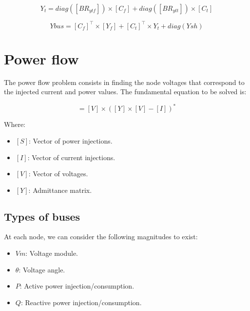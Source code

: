 \documentclass[nols,a4paper,twoside,symmetric,notoc,fleqn]{tufte-book}
\begin{document}
\begin{equation}
Y_t = diag([BR_{ytf}]) \times [C_f] + diag([BR_{ytt}]) \times [C_t]
\end{equation}

\begin{equation}
Ybus = [C_f]^\top \times [Y_f] + [C_t]^\top \times Y_t + diag(Ysh)
\end{equation}

\chapter{Power flow} \label{ch:power_flow}

The power flow problem consists in finding the node voltages that correspond to the injected current and power values. The fundamental equation to be solved is:

\begin{equation}
[S] = [V] \times \left([Y] \times [V] - [I] \right)^*
\label{eq:power_flow}
\end{equation}


Where:

\begin{itemize}
\item $[S]$: Vector of power injections.
\item $[I]$: Vector of current injections.
\item $[V]$: Vector of voltages.
\item $[Y]$: Admittance matrix.
\end{itemize}


\section{Types of buses}

At each node, we can consider the following magnitudes to exist:
\begin{itemize}
	\item $Vm$: Voltage module.
	\item $\theta$: Voltage angle.
	\item $P$: Active power injection/consumption.
	\item $Q$: Reactive power injection/consumption.
\end{itemize}
\end{document}
